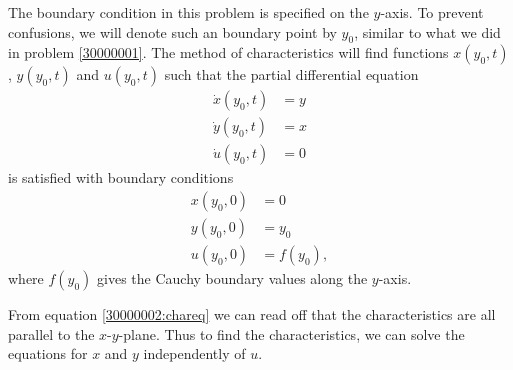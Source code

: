 \begin{loesung}
The boundary condition in this problem is specified on the $y$-axis.
To prevent confusions, we will denote such an boundary point by $y_0$, similar
to what we did in problem \ref{30000001}.
The method of characteristics will find functions $x(y_0,t)$,
$y(y_0,t)$ and $u(y_0,t)$ such that the partial differential equation
\begin{equation}
\begin{aligned}
\dot x(y_0, t)&=y\\
\dot y(y_0, t)&=x\\
\dot u(y_0, t)&=0
\end{aligned}
\label{30000002:chareq}
\end{equation}
is satisfied with boundary conditions
\begin{align*}
x(y_0, 0)&=0\\
y(y_0, 0)&=y_0\\
u(y_0, 0)&=f(y_0),
\end{align*}
where $f(y_0)$ gives the Cauchy boundary values along the $y$-axis.
\begin{teilaufgaben}
\item
From equation \eqref{30000002:chareq} we can read off that the characteristics
are all parallel to the $x$-$y$-plane.
Thus to find the characteristics, we can solve the equations for $x$ and $y$
independently of $u$.


\end{teilaufgaben}
\end{loesung}
